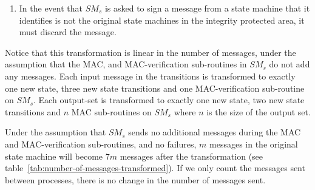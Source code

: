 \documentclass{article}
\begin{document}
\begin{enumerate}
		\item In the event that $SM_s$ is asked to sign a message from a state machine that it identifies is not the original state machines in the integrity protected area, it must discard the message.
	\end{enumerate}

	Notice that this transformation is linear in the number of messages, under the assumption that the MAC, and MAC-verification sub-routines in $SM_s$ do not add any messages.
	Each input message in the transitions is transformed to exactly one new state, three new state transitions and one MAC-verification sub-routine on $SM_s$.
	Each output-set is transformed to exactly one new state, two new state transitions and $n$ MAC sub-routines on $SM_s$ where $n$ is the size of the output set.

	\begin{table}[ht!]
	\centering
	\caption{Number of messages after the transformation}
	\label{tab:number-of-messages-transformed}
	\end{table}

	Under the assumption that $SM_s$ sends no additional messages during the MAC and MAC-verification sub-routines, and no failures, $m$ messages in the original state machine will become $7m$ messages after the transformation (see table~\ref{tab:number-of-messages-transformed}).
	If we only count the messages sent between processes, there is no change in the number of messages sent.
\end{document}
